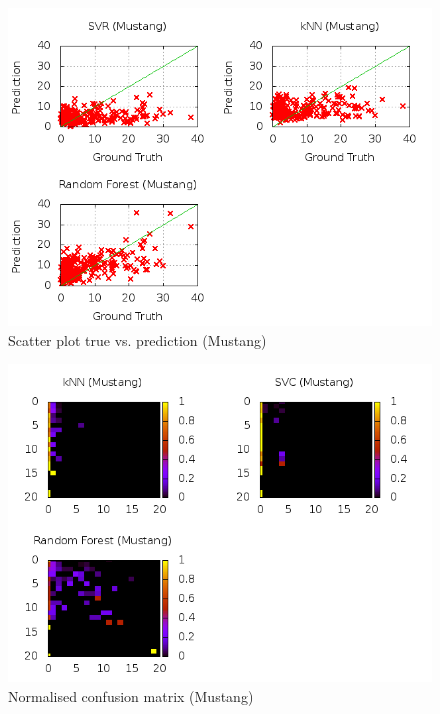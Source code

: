 \begin{figure}
\centering
\includegraphics[scale=0.55]{images/plots/machine_learning/mustang/true_pred_mustang.png}
\caption{Scatter plot true vs. prediction (Mustang)}
\label{true_predict_mustang}
\end{figure}
\begin{figure}
\centering
\includegraphics[scale=0.55]{images/plots/machine_learning/mustang/conf_mat_mustang.png}
\caption{Normalised confusion matrix (Mustang)}
\label{conf_mat_mustang}
\end{figure}
